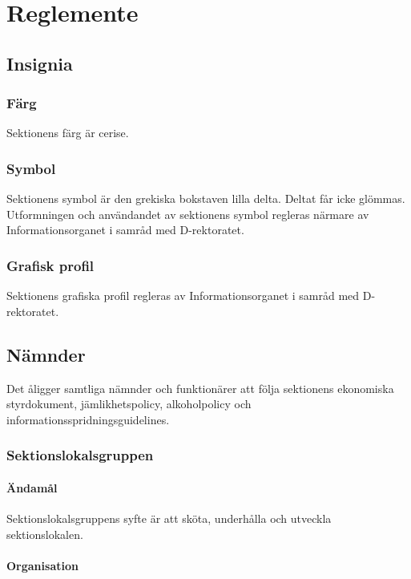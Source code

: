 \documentclass[a4paper,12pt]{article}
\begin{document}
\section{Reglemente}

\subsection{Insignia}

\subsubsection{Färg}

Sektionens färg är cerise.

\subsubsection{Symbol}

Sektionens symbol är den grekiska bokstaven lilla delta. Deltat får icke glömmas. Utformningen och användandet av sektionens symbol regleras närmare av Informationsorganet i samråd med D-rektoratet.

\subsubsection{Grafisk profil}

Sektionens grafiska profil regleras av Informationsorganet i samråd med D-rektoratet.

\subsection{Nämnder}

Det åligger samtliga nämnder och funktionärer att följa sektionens ekonomiska styrdokument, jämlikhetspolicy, alkoholpolicy och informationsspridningsguidelines.

\subsubsection{Sektionslokalsgruppen}

\paragraph{Ändamål}

Sektionslokalsgruppens syfte är att sköta, underhålla och utveckla sektionslokalen.

\paragraph{Organisation}
\end{document}
